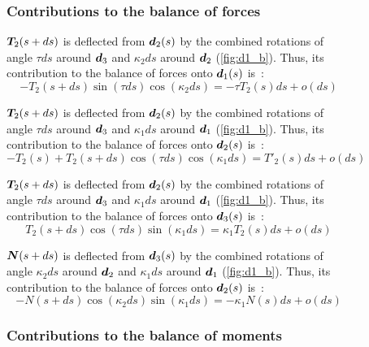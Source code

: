 \begin{figure}[p]
	\begin{fullpage}
	\subsubsection{Contributions to the balance of forces}
	\vspace{10pt}
	
	$\boldsymbol{T}_2(s+ds)$ is deflected from $\boldsymbol{d}_2(s)$ by the combined rotations of angle $\tau ds$ around $\boldsymbol{d}_3$ and $\kappa_2 ds$ around $\boldsymbol{d}_2$ (\cref{fig:d1_b}). Thus, its contribution to the balance of forces onto $\boldsymbol{d}_1(s)$ is~: 
	\begin{equation*}
		-T_2(s+ds) \sin(\tau ds) \cos(\kappa_2 ds) = -\tau T_2(s) ds + o(ds)
	\end{equation*}	
	
	$\boldsymbol{T}_2(s+ds)$ is deflected from $\boldsymbol{d}_2(s)$ by the combined rotations of angle $\tau ds$ around $\boldsymbol{d}_3$ and $\kappa_1 ds$ around $\boldsymbol{d}_1$ (\cref{fig:d1_b}). Thus, its contribution to the balance of forces onto $\boldsymbol{d}_2(s)$ is~: 
	\begin{equation*}
		-T_2(s) + T_2(s+ds) \cos(\tau ds) \cos(\kappa_1 ds) = T'_2 (s) ds + o(ds)
	\end{equation*}	
	
	$\boldsymbol{T}_2(s+ds)$ is deflected from $\boldsymbol{d}_2(s)$ by the combined rotations of angle $\tau ds$ around $\boldsymbol{d}_3$ and $\kappa_1 ds$ around $\boldsymbol{d}_1$ (\cref{fig:d1_b}). Thus, its contribution to the balance of forces onto $\boldsymbol{d}_3(s)$ is~: 
	\begin{equation*}
		T_2(s+ds) \cos(\tau ds) \sin(\kappa_1 ds) = \kappa_1 T_2(s) ds + o(ds)
	\end{equation*}
		
	$\boldsymbol{N}(s+ds)$ is deflected from $\boldsymbol{d}_3(s)$ by the combined rotations of angle $\kappa_2 ds$ around $\boldsymbol{d}_2$ and $\kappa_1 ds$ around $\boldsymbol{d}_1$ (\cref{fig:d1_b}). Thus, its contribution to the balance of forces onto $\boldsymbol{d}_2(s)$ is~: 
	\begin{equation*}
		-N(s+ds) \cos(\kappa_2 ds) \sin(\kappa_1 ds) = -\kappa_1 N(s) ds + o(ds)
	\end{equation*}	
	\vspace{10pt}

	\subsubsection{Contributions to the balance of moments}
	\vspace{10pt}
	

\end{fullpage}
\end{figure}
